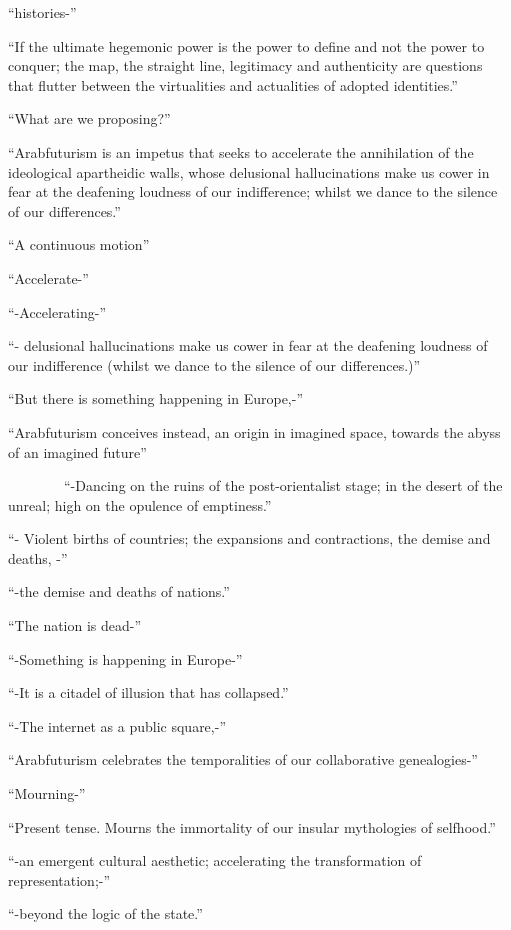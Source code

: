 ``histories-''

``If the ultimate hegemonic power is the power to define and not the
power to conquer; the map, the straight line, legitimacy and
authenticity are questions that flutter between the virtualities and
actualities of adopted identities.''

``What are we proposing?''

``Arabfuturism is an impetus that seeks to accelerate the annihilation
of the ideological apartheidic walls, whose delusional hallucinations
make us cower in fear at the deafening loudness of our indifference;
whilst we dance to the silence of our differences.''

``A continuous motion''

``Accelerate-''

``-Accelerating-''

``- delusional hallucinations make us cower in fear at the deafening
loudness of our indifference (whilst we dance to the silence of our
differences.)''

``But there is something happening in Europe,-''

``Arabfuturism conceives instead, an origin in imagined space, towards
the abyss of an imagined future''

~~~~~~~~``-Dancing on the ruins of the post-orientalist stage; in the
desert of the unreal; high on the opulence of emptiness.''

``- Violent births of countries; the expansions and contractions, the
demise and deaths, -''

``-the demise and deaths of nations.''

``The nation is dead-''

``-Something is happening in Europe-''

``-It is a citadel of illusion that has collapsed.''

``-The internet as a public square,-''

``Arabfuturism celebrates the temporalities of our collaborative
genealogies-''

``Mourning-''

``Present tense. Mourns the immortality of our insular mythologies of
selfhood.''

``-an emergent cultural aesthetic; accelerating the transformation of
representation;-''

``-beyond the logic of the state.''
